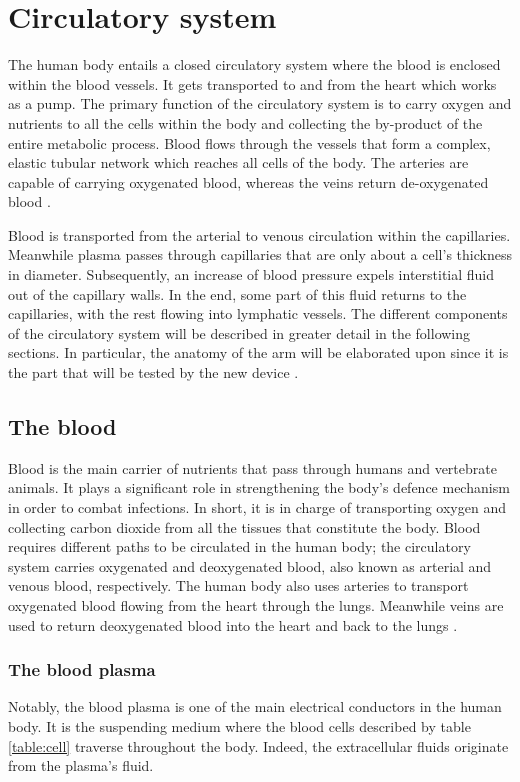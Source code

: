 \section{Circulatory system} %
\label{section literature circulatory system}
The human body entails a closed circulatory system where the blood is enclosed within the blood vessels. It gets transported to and from the heart which works as a pump. The primary function of the circulatory system is to carry oxygen and nutrients to all the cells within the body and collecting the by-product of the entire metabolic process. Blood flows through the vessels that form a complex, elastic tubular network which reaches all cells of the body. The arteries are capable of carrying oxygenated blood, whereas the veins return de-oxygenated blood \cite{nichols2011mcdonald}. 

Blood is transported from the arterial to venous circulation within the capillaries. Meanwhile plasma passes through capillaries that are only about a cell's thickness in diameter. Subsequently, an increase of blood pressure expels interstitial fluid out of the capillary walls. In the end, some part of this fluid returns to the capillaries, with the rest flowing into lymphatic vessels. The different components of the circulatory system will be described in greater detail in the following sections. In particular, the anatomy of the arm will be elaborated upon since it is the part that will be tested by the new device \cite{Hall:2015aa}.

\subsection{The blood}
\label{section literature blood}
Blood is the main carrier of nutrients that pass through humans and vertebrate animals. It plays a significant role in strengthening the body's defence mechanism in order to combat infections. In short, it is in charge of transporting oxygen and collecting carbon dioxide from all the tissues that constitute the body. Blood requires different paths to be circulated in the human body; the circulatory system carries oxygenated and deoxygenated blood, also known as arterial and venous blood, respectively. The human body also uses arteries to transport oxygenated blood flowing from the heart through the lungs. Meanwhile veins are used to return deoxygenated blood into the heart and back to the lungs \cite{Hall:2015aa}.

\subsubsection{The blood plasma}
Notably, the blood plasma is one of the main electrical conductors in the human body. It is the suspending medium where the blood cells described by table \ref{table:cell} traverse throughout the body. Indeed, the extracellular fluids originate from the plasma's fluid.

